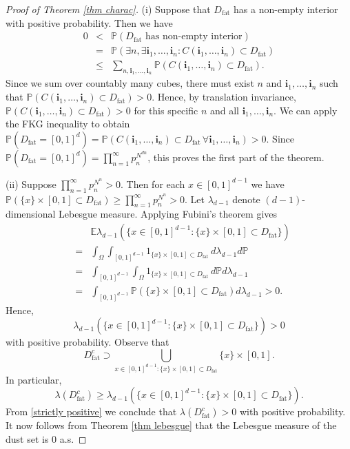 \documentclass[11pt,a4paper]{article}
\newcommand{\Ii}{\ensuremath{\mathbf{i}}}
\newcommand{\IE}{\ensuremath{\mathbb{E}}}
\newcommand{\IP}{\ensuremath{\mathbb{P}}}
\newcommand{\Dfat}{\ensuremath{D_{\text{fat}}}}
\newcommand{\Dfatc}{\ensuremath{D_{\text{fat}}^{c}}}
\theoremstyle{remark}
\begin{document}
\begin{proof}[Proof of Theorem \ref{thm charac}]
(i) Suppose that $\Dfat$ has a non-empty interior with positive probability. Then we have
\begin{eqnarray*}
0 &<& \IP(\Dfat \text{ has non-empty interior}) \\
&=& \IP(\exists n, \exists \Ii_1,\ldots,\Ii_n: C(\Ii_1,\ldots,\Ii_n) \subset \Dfat) \\
&\leq& \sum_{ n, \Ii_1,\ldots,\Ii_n} \IP(C(\Ii_1,\ldots,\Ii_n) \subset \Dfat).
\end{eqnarray*}
Since we sum over countably many cubes, there must exist $n$ and $\Ii_1,\ldots,\Ii_n$ such that $\IP(C(\Ii_1,\ldots,\Ii_n) \subset \Dfat) > 0$. Hence, by translation invariance, $\IP(C(\Ii_1,\ldots,\Ii_n) \subset \Dfat) > 0$ for this specific $n$ and all $\Ii_1,\ldots,\Ii_n$. We can apply the FKG inequality to obtain $\IP(\Dfat = [0,1]^d) = \IP(C(\Ii_1,\ldots,\Ii_n) \subset \Dfat \,\forall \Ii_1,\ldots,\Ii_n) >0$. Since $\IP(\Dfat = [0,1]^d) = \prod_{n=1}^{\infty} p_n^{N^{dn}}$, this proves the first part of the theorem.



(ii) Suppose $\prod_{n=1}^{\infty} p_n^{N^n} > 0$. Then for each $x\in [0,1]^{d-1}$ we have $\IP(\{x\} \times [0,1] \subset \Dfat) \geq \prod_{n=1}^{\infty} p_n^{N^n} > 0$. Let $\lambda_{d-1}$ denote $(d-1)$-dimensional Lebesgue measure. 
Applying Fubini's theorem gives
\begin{eqnarray*}
&& \IE \lambda_{d-1}(\{x\in [0,1]^{d-1} : \{x\}\times [0,1] \subset \Dfat\}) \nonumber \\
&=&  \int_{\Omega} \int_{[0,1]^{d-1}} 1_{\{x\}\times [0,1] \subset \Dfat}\,d\lambda_{d-1} d\IP \nonumber \\
&=& \int_{[0,1]^{d-1}} \int_{\Omega} 1_{\{x\}\times [0,1] \subset \Dfat}\,d\IP d\lambda_{d-1} \nonumber \\
&=& \int_{[0,1]^{d-1}} \IP(\{x\}\times [0,1] \subset \Dfat) d\lambda_{d-1} >0. 
\end{eqnarray*}
Hence, 
\begin{equation}\label{strictly positive}
\lambda_{d-1}(\{x\in [0,1]^{d-1} : \{x\}\times [0,1] \subset \Dfat \}) > 0
\end{equation}
with positive probability. Observe that 
\[
\Dfatc \supset \bigcup_{x \in [0,1]^{d-1}: \{x\}\times[0,1]\subset \Dfat} \{x\} \times [0,1].                                                                                                                                               
\]
In particular,
\[
\lambda(\Dfatc) \geq \lambda_{d-1}(\{x\in [0,1]^{d-1} : \{x\}\times [0,1] \subset \Dfat\}).
\]
From \eqref{strictly positive} we conclude that $\lambda(\Dfatc)>0$ with positive probability. It now follows from Theorem \ref{thm lebesgue} that the Lebesgue measure of the dust set is 0 a.s.




\end{proof}
\end{document}
